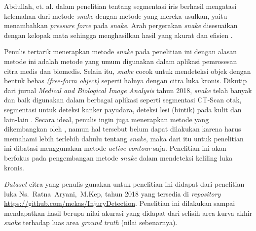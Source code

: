 Abdullah, et. al. dalam penelitian tentang segmentasi iris berhasil mengatasi kelemahan dari metode \emph{snake} dengan metode yang mereka usulkan, yaitu menambahkan \emph{pressure force} pada \emph{snake}. Arah pergerakan \emph{snake} disesuaikan dengan kelopak mata sehingga menghasilkan hasil yang akurat dan efisien \citep{abdullah2016robust}.

Penulis tertarik menerapkan metode \emph{snake} pada penelitian ini dengan alasan metode ini adalah metode yang umum digunakan dalam aplikasi pemrosesan citra medis dan biomedis. Selain itu, \emph{snake} cocok untuk mendeteksi objek dengan bentuk bebas \emph{(free-form object)} seperti halnya dengan citra luka kronis. Dikutip dari jurnal \emph{Medical and Biological Image Analysis} tahun 2018, \emph{snake} telah banyak dan baik digunakan dalam berbagai aplikasi seperti segmentasi CT-Scan otak, segmentasi untuk deteksi kanker payudara, deteksi lesi (bintik) pada kulit dan lain-lain \citep{hemalatha2018active}. %
Secara ideal, penulis ingin juga menerapkan metode yang dikembangkan oleh \citep{abdullah2016robust}, namun hal tersebut belum dapat dilakukan karena harus memahami lebih terlebih dahulu tentang \emph{snake}, maka dari itu untuk penelitian ini dibatasi menggunakan metode \emph{active contour} saja. Penelitian ini akan berfokus pada pengembangan metode \emph{snake} dalam mendeteksi keliling luka kronis.

\emph{Dataset} citra yang penulis gunakan untuk penelitian ini didapat dari penelitian luka \mbox{Ns. Ratna Aryani, M.Kep}, tahun 2018 \mbox{\citep{ratna2018rancang}} yang tersedia di \emph{repository} \url{https://github.com/mekas/InjuryDetection}. Penelitian ini dilakukan sampai mendapatkan hasil berupa nilai akurasi yang didapat dari selisih area kurva akhir \emph{snake} terhadap luas area \emph{ground truth} (nilai sebenarnya).



